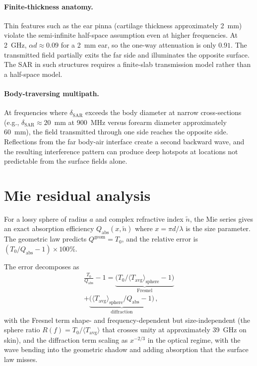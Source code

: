 \documentclass[journal,twocolumn,10pt]{IEEEtran}
\theoremstyle{plain}
\theoremstyle{remark}
\newcommand{\Tavg}{T_{\mathrm{avg}}}
\newcommand{\ntilde}{\tilde{n}}
\begin{document}
\paragraph{Finite-thickness anatomy.}
Thin features such as the ear pinna (cartilage thickness
approximately 2~mm) violate the semi-infinite half-space assumption even
at higher frequencies. At 2~GHz, $\alpha d \approx 0.09$ for a
2~mm ear, so the one-way attenuation is only $0.91$. The
transmitted field partially exits the far side and illuminates the
opposite surface. The SAR in such structures requires a
finite-slab transmission model rather than a half-space model.

\paragraph{Body-traversing multipath.}
At frequencies where $\delta_{\mathrm{SAR}}$ exceeds the body
diameter at narrow cross-sections (e.g., $\delta_{\mathrm{SAR}}
\approx 20$~mm at 900~MHz versus forearm diameter
approximately 60~mm), the field transmitted through one side reaches the
opposite side. Reflections from the far body-air interface create a
second backward wave, and the resulting interference pattern can
produce deep hotspots at locations not predictable from the surface
fields alone.


\section{Mie residual analysis}\label{si:mie}

For a lossy sphere of radius $a$ and complex refractive index
$\ntilde$, the Mie series gives an exact absorption efficiency
$Q_{\mathrm{abs}}(x, \ntilde)$ where $x = \pi d/\lambda$ is the size
parameter. The geometric law predicts $Q^{\mathrm{geom}} = T_0$, and
the relative error is $(T_0/Q_{\mathrm{abs}} - 1)\times 100\%$.

The error decomposes as
\begin{multline}\label{eq:mie-error-decomp}
  \frac{T_0}{Q_{\mathrm{abs}}} - 1
  = \underbrace{\bigl(T_0/\langle\Tavg\rangle_{\mathrm{sphere}}
    - 1\bigr)}_{\mathrm{Fresnel}}\\
    + \underbrace{\bigl(\langle\Tavg\rangle_{\mathrm{sphere}}
    /Q_{\mathrm{abs}} - 1\bigr)}_{\mathrm{diffraction}}\, ,
\end{multline}
with the Fresnel term shape- and frequency-dependent but
size-independent (the sphere ratio $R(f) =
T_0/\langle\Tavg\rangle$ that crosses unity at approximately 39~GHz on
skin), and the diffraction term scaling as $x^{-2/3}$ in the optical
regime, with the wave bending into the geometric shadow and adding
absorption that the surface law misses.
\end{document}
